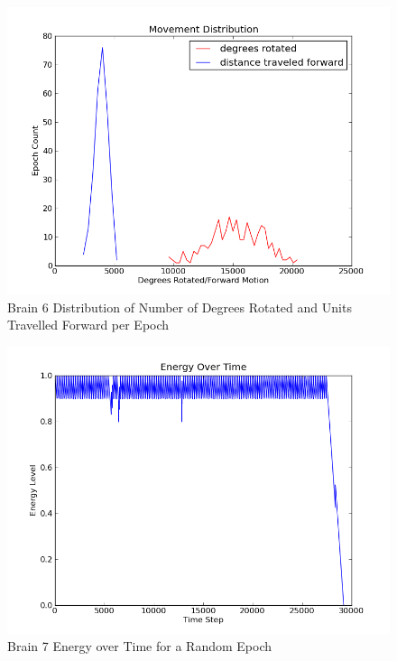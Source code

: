 \documentclass[a4paper,11pt]{article}
\begin{document}
\begin{figure}
\begin{center}
  \includegraphics[scale=1.0]{img/brain6/travelGauss-r3203.12-d916.52.png}
  \caption{Brain 6 Distribution of Number of Degrees Rotated and Units Travelled Forward per Epoch}
  \label{fig:b6travel}
\end{center}
\end{figure}













\begin{figure}
\begin{center}
  \includegraphics[scale=1.0]{img/brain7/1354746755-0.250000-EvT.png}
  \caption{Brain 7 Energy over Time for a Random Epoch}
  \label{fig:b7evt}
\end{center}
\end{figure}
\end{document}
